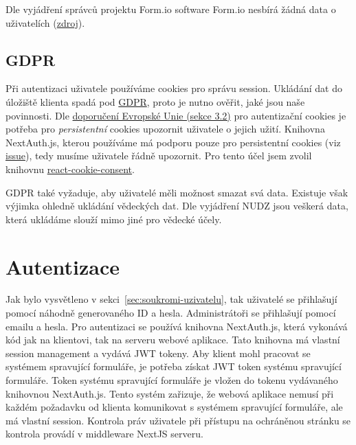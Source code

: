 Dle vyjádření správců projektu Form.io software Form.io nesbírá žádná data o uživatelích (\href{https://github.com/formio/formio/issues/1499}{zdroj}).

\subsection{GDPR}\label{subsec:gdpr}

Při autentizaci uživatele používáme cookies pro správu session.
Ukládání dat do úložiště klienta spadá pod \href{https://eur-lex.europa.eu/eli/reg/2016/679/oj}{GDPR}, proto je nutno ověřit, jaké jsou naše povinnosti.
Dle \href{https://ec.europa.eu/justice/article-29/documentation/opinion-recommendation/files/2012/wp194_en.pdf}{doporučení Evropské Unie (sekce 3.2)} pro autentizační cookies je potřeba pro \emph{persistentní} cookies upozornit uživatele o jejich užití.
Knihovna NextAuth.js, kterou používáme má podporu pouze pro persistentní cookies (viz \href{https://github.com/nextauthjs/next-auth/issues/2534}{issue}), tedy musíme uživatele řádně upozornit.
Pro tento účel jsem zvolil knihovnu \href{https://www.npmjs.com/package/react-cookie-consent}{react-cookie-consent}.

GDPR také vyžaduje, aby uživatelé měli možnost smazat svá data.
Existuje však výjimka ohledně ukládání vědeckých dat.
Dle vyjádření NUDZ jsou veškerá data, která ukládáme slouží mimo jiné pro vědecké účely.

\section{Autentizace}\label{sec:auth}

Jak bylo vysvětleno v sekci~\ref{sec:soukromi-uzivatelu}, tak uživatelé se přihlašují pomocí náhodně generovaného ID a hesla.
Administrátoři se přihlašují pomocí emailu a hesla.
Pro autentizaci se používá knihovna NextAuth.js, která vykonává kód jak na klientovi, tak na serveru webové aplikace.
Tato knihovna má vlastní session management a vydává JWT tokeny.
Aby klient mohl pracovat se systémem spravující formuláře, je potřeba získat JWT token systému spravující formuláře.
Token systému spravující formuláře je vložen do tokenu vydávaného knihovnou NextAuth.js.
Tento systém zařizuje, že webová aplikace nemusí při každém požadavku od klienta komunikovat s systémem spravující formuláře, ale má vlastní session.
Kontrola práv uživatele při přístupu na ochráněnou stránku se kontrola provádí v middleware NextJS serveru.

